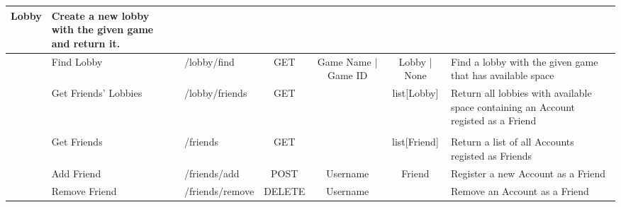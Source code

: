 \begin{table}[H]
{\begin{tabular}{|cllcccl|}
      \multicolumn{1}{c|}{\cellcolor[HTML]{FFF8DD}Lobby} &
      Create   a new lobby with the given game and return it. \\ \hline
    \rowcolor[HTML]{FFDDDD} 
    \multicolumn{1}{|c|}{\cellcolor[HTML]{63BE7B}} &
      \multicolumn{1}{l|}{\cellcolor[HTML]{FFDDDD}Find Lobby} &
      \multicolumn{1}{l|}{\cellcolor[HTML]{FFDDDD}/lobby/find} &
      \multicolumn{1}{c|}{\cellcolor[HTML]{FFDDDD}GET} &
      \multicolumn{1}{c|}{\cellcolor[HTML]{FFDDDD}Game Name | Game ID} &
      \multicolumn{1}{c|}{\cellcolor[HTML]{FFDDDD}Lobby | None} &
      Find   a lobby with the given game that has available space \\ \hline
    \rowcolor[HTML]{FFF8DD} 
    \multicolumn{1}{|c|}{\cellcolor[HTML]{63BE7B}} &
      \multicolumn{1}{l|}{\cellcolor[HTML]{FFF8DD}Get Friends' Lobbies} &
      \multicolumn{1}{l|}{\cellcolor[HTML]{FFF8DD}/lobby/friends} &
      \multicolumn{1}{c|}{\cellcolor[HTML]{FFF8DD}GET} &
      \multicolumn{1}{c|}{\cellcolor[HTML]{FFF8DD}} &
      \multicolumn{1}{c|}{\cellcolor[HTML]{FFF8DD}list{[}Lobby{]}} &
      Return   all lobbies with available space containing an Account registed as a   Friend \\ \hline
    \rowcolor[HTML]{DDF0FF} 
    \multicolumn{7}{|c|}{\cellcolor[HTML]{DDF0FF}\textbf{Friends}} \\ \hline
    \rowcolor[HTML]{FFF8DD} 
    \multicolumn{1}{|c|}{\cellcolor[HTML]{63BE7B}} &
      \multicolumn{1}{l|}{\cellcolor[HTML]{FFF8DD}Get Friends} &
      \multicolumn{1}{l|}{\cellcolor[HTML]{FFF8DD}/friends} &
      \multicolumn{1}{c|}{\cellcolor[HTML]{FFF8DD}GET} &
      \multicolumn{1}{c|}{\cellcolor[HTML]{FFF8DD}} &
      \multicolumn{1}{c|}{\cellcolor[HTML]{FFF8DD}list{[}Friend{]}} &
      Return   a list of all Accounts registed as Friends \\ \hline
    \rowcolor[HTML]{FFDDDD} 
    \multicolumn{1}{|c|}{\cellcolor[HTML]{63BE7B}} &
      \multicolumn{1}{l|}{\cellcolor[HTML]{FFDDDD}Add Friend} &
      \multicolumn{1}{l|}{\cellcolor[HTML]{FFDDDD}/friends/add} &
      \multicolumn{1}{c|}{\cellcolor[HTML]{FFDDDD}POST} &
      \multicolumn{1}{c|}{\cellcolor[HTML]{FFDDDD}Username} &
      \multicolumn{1}{c|}{\cellcolor[HTML]{FFDDDD}Friend} &
      Register   a new Account as a Friend \\ \hline
    \rowcolor[HTML]{FFF8DD} 
    \multicolumn{1}{|c|}{\cellcolor[HTML]{63BE7B}} &
      \multicolumn{1}{l|}{\cellcolor[HTML]{FFF8DD}Remove Friend} &
      \multicolumn{1}{l|}{\cellcolor[HTML]{FFF8DD}/friends/remove} &
      \multicolumn{1}{c|}{\cellcolor[HTML]{FFF8DD}DELETE} &
      \multicolumn{1}{c|}{\cellcolor[HTML]{FFF8DD}Username} &
      \multicolumn{1}{c|}{\cellcolor[HTML]{FFF8DD}} &
      Remove   an Account as a Friend \\ \hline
    \end{tabular}%
    }
\end{table}